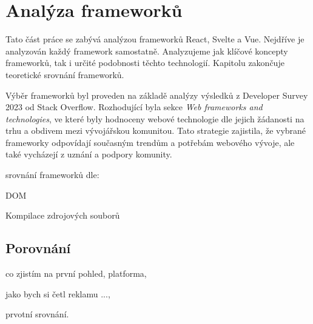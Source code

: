 \section{Analýza frameworků}

Tato část práce se zabývá analýzou frameworků React, Svelte a Vue. Nejdříve je analyzován každý framework samostatně. 
Analyzujeme jak klíčové koncepty frameworků, tak i určité podobnosti těchto technologií. Kapitolu zakončuje teoretické srovnání frameworků.

Výběr frameworků byl proveden na základě analýzy výsledků z Developer Survey 2023 od Stack Overflow. 
Rozhodující byla sekce \textit{Web frameworks and technologies}, ve které byly hodnoceny webové technologie dle jejich žádanosti na trhu a obdivem mezi vývojářskou komunitou. 
Tato strategie zajistila, že vybrané frameworky odpovídají současným trendům a potřebám webového vývoje, ale také vycházejí z uznání a podpory komunity.\cite{stackoverflow, developersurvey}

\begin{citemize}
	\item srovnání frameworků dle:
	\begin{cenumerate}
		\item DOM %
		\item Kompilace zdrojových souborů %
	\end{cenumerate}
\end{citemize}







\subsection{Porovnání}

\begin{citemize}
	\item co zjistím na první pohled, platforma,
	\item jako bych si četl reklamu ...,
	\item prvotní srovnání.
\end{citemize}
